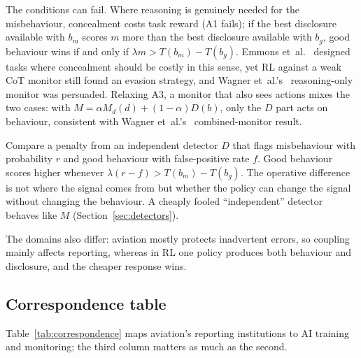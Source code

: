 \documentclass[11pt]{article}
\begin{document}
The conditions can fail. Where reasoning is genuinely needed for the misbehaviour, concealment costs task reward (A1 fails); if the best disclosure available with \(b_m\) scores \(m\) more than the best disclosure available with \(b_g\), good behaviour wins if and only if \(\lambda m > T(b_m) - T(b_g)\). Emmons et~al.~\cite{emmons2025} designed tasks where concealment should be costly in this sense, yet RL against a weak CoT monitor still found an evasion strategy, and Wagner et~al.'s~\cite{wagner2025} reasoning-only monitor was persuaded. Relaxing A3, a monitor that also sees actions mixes the two cases: with \(M = \alpha M_d(d) + (1-\alpha) D(b)\), only the \(D\) part acts on behaviour, consistent with Wagner et~al.'s~\cite{wagner2025} combined-monitor result.

Compare a penalty from an independent detector \(D\) that flags misbehaviour with probability \(r\) and good behaviour with false-positive rate \(f\). Good behaviour scores higher whenever \(\lambda (r - f) > T(b_m) - T(b_g)\). The operative difference is not where the signal comes from but whether the policy can change the signal without changing the behaviour. A cheaply fooled ``independent'' detector behaves like \(M\) (Section~\ref{sec:detectors}).

The domains also differ: aviation mostly protects inadvertent errors, so coupling mainly affects reporting, whereas in RL one policy produces both behaviour and disclosure, and the cheaper response wins.

\subsection{Correspondence table}\label{sec:table}

Table~\ref{tab:correspondence} maps aviation's reporting institutions to AI training and monitoring; the third column matters as much as the second.
\end{document}
